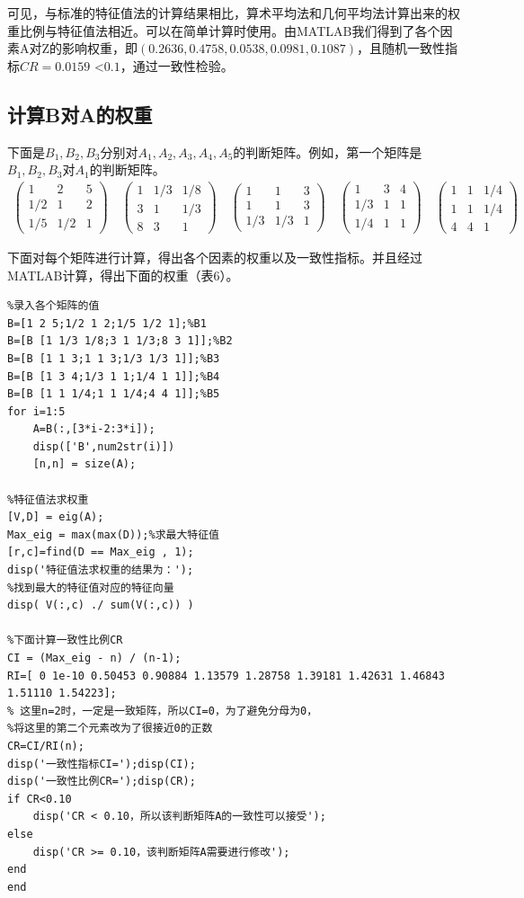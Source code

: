 \documentclass{ctexart}
\begin{document}
可见，与标准的特征值法的计算结果相比，算术平均法和几何平均法计算出来的权重比例与特征值法相近。可以在简单计算时使用。由MATLAB我们得到了各个因素A对Z的影响权重，即$(0.2636,0.4758,0.0538,0.0981,0.1087)$，且随机一致性指标$CR=0.0159$ \textless $0.1$，通过一致性检验。


\subsection{计算B对A的权重}
下面是$B_{1},B_{2},B_{3}$分别对$A_{1},A_{2},A_{3},A_{4},A_{5}$的判断矩阵。例如，第一个矩阵是$B_{1},B_{2},B_{3}$对$A_{1}$的判断矩阵。
$$\begin{gathered}
\begin{pmatrix} 1 & 2 &5 \\ 1/2 & 1 & 2\\ 1/5& 1/2 &1\end{pmatrix}
\quad
\begin{pmatrix} 1 & 1/3 &1/8 \\ 3 & 1 & 1/3\\ 8& 3 &1\end{pmatrix}
\quad
\begin{pmatrix} 1 & 1 &3 \\ 1 & 1 & 3\\ 1/3& 1/3 &1\end{pmatrix}
\quad
\begin{pmatrix} 1 & 3 &4 \\ 1/3 & 1 & 1\\ 1/4& 1 &1\end{pmatrix}
\quad
\begin{pmatrix} 1 & 1 &1/4 \\ 1 & 1 & 1/4\\ 4& 4 &1\end{pmatrix}
\end{gathered}$$


下面对每个矩阵进行计算，得出各个因素的权重以及一致性指标。并且经过MATLAB计算，得出下面的权重（表6）。

\begin{lstlisting}
%录入各个矩阵的值
B=[1 2 5;1/2 1 2;1/5 1/2 1];%B1
B=[B [1 1/3 1/8;3 1 1/3;8 3 1]];%B2
B=[B [1 1 3;1 1 3;1/3 1/3 1]];%B3
B=[B [1 3 4;1/3 1 1;1/4 1 1]];%B4
B=[B [1 1 1/4;1 1 1/4;4 4 1]];%B5
for i=1:5
    A=B(:,[3*i-2:3*i]);
    disp(['B',num2str(i)])
    [n,n] = size(A);

%特征值法求权重
[V,D] = eig(A);
Max_eig = max(max(D));%求最大特征值
[r,c]=find(D == Max_eig , 1);
disp('特征值法求权重的结果为：');
%找到最大的特征值对应的特征向量
disp( V(:,c) ./ sum(V(:,c)) )

%下面计算一致性比例CR
CI = (Max_eig - n) / (n-1);
RI=[ 0 1e-10 0.50453 0.90884 1.13579 1.28758 1.39181 1.42631 1.46843 1.51110 1.54223];
% 这里n=2时，一定是一致矩阵，所以CI=0，为了避免分母为0，
%将这里的第二个元素改为了很接近0的正数
CR=CI/RI(n);
disp('一致性指标CI=');disp(CI);
disp('一致性比例CR=');disp(CR);
if CR<0.10
    disp('CR < 0.10，所以该判断矩阵A的一致性可以接受');
else
    disp('CR >= 0.10，该判断矩阵A需要进行修改');
end
end
\end{lstlisting}
\end{document}
